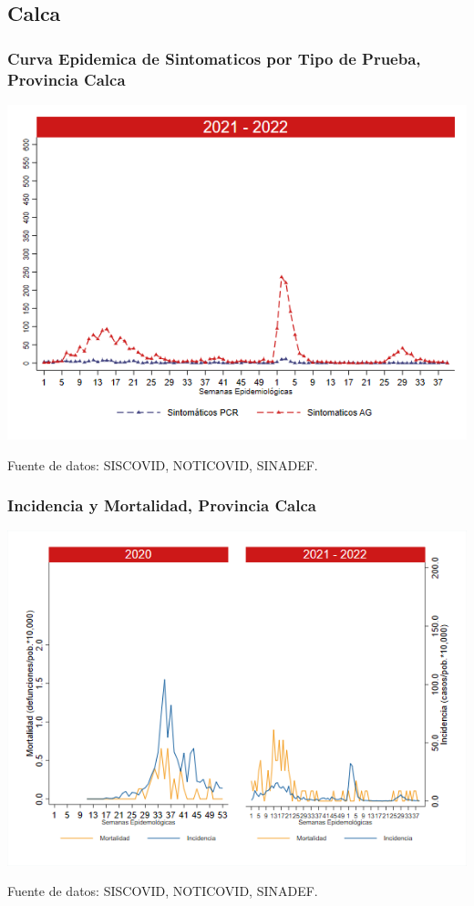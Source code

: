 \documentclass[xcolor=table]{beamer}
\begin{document}
\subsection{Calca}
\begin{frame}[label=Calca]
	\frametitle{Curva Epidemica de Sintomaticos por Tipo de Prueba, Provincia Calca}
	\vspace{-.5cm}
	\begin{center}
		\includegraphics[width=0.8\linewidth, trim={0cm .5cm 0cm 0.2cm},clip]{../figuras/sinto_prueba20_21_3.png}
	\end{center}
	{\tiny Fuente de datos: SISCOVID, NOTICOVID, SINADEF.}
	\hyperlink{TipoPrueba}{}
\end{frame}

\begin{frame}[label=Calca]
	\frametitle{Incidencia y Mortalidad, Provincia Calca}
	\vspace{-.5cm}
	\begin{center}
		\includegraphics[width=0.8\linewidth, trim={0cm .5cm 0cm 0.2cm},clip]{../figuras/incidencia_mortalidad_20_21_3.png}
	\end{center}
	{\tiny Fuente de datos: SISCOVID, NOTICOVID, SINADEF.}
\end{frame}
\end{document}

